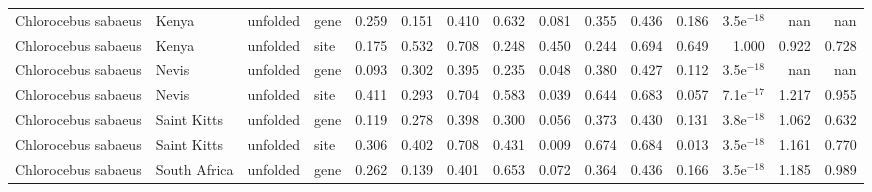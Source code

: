 \begin{longtable}{llllrrrrrrrrrrr}
 Chlorocebus sabaeus &                     Kenya &  unfolded &  gene &                              0.259 &                               0.151 &                 0.410 &                 0.632 &                              0.081 &                               0.355 &                 0.436 &                 0.186 & 3.5e$^{-18}$ &    nan &    nan \\
 Chlorocebus sabaeus &                     Kenya &  unfolded &  site &                              0.175 &                               0.532 &                 0.708 &                 0.248 &                              0.450 &                               0.244 &                 0.694 &                 0.649 &        1.000 &  0.922 &  0.728 \\
 Chlorocebus sabaeus &                     Nevis &  unfolded &  gene &                              0.093 &                               0.302 &                 0.395 &                 0.235 &                              0.048 &                               0.380 &                 0.427 &                 0.112 & 3.5e$^{-18}$ &    nan &    nan \\
 Chlorocebus sabaeus &                     Nevis &  unfolded &  site &                              0.411 &                               0.293 &                 0.704 &                 0.583 &                              0.039 &                               0.644 &                 0.683 &                 0.057 & 7.1e$^{-17}$ &  1.217 &  0.955 \\
 Chlorocebus sabaeus &               Saint Kitts &  unfolded &  gene &                              0.119 &                               0.278 &                 0.398 &                 0.300 &                              0.056 &                               0.373 &                 0.430 &                 0.131 & 3.8e$^{-18}$ &  1.062 &  0.632 \\
 Chlorocebus sabaeus &               Saint Kitts &  unfolded &  site &                              0.306 &                               0.402 &                 0.708 &                 0.431 &                              0.009 &                               0.674 &                 0.684 &                 0.013 & 3.5e$^{-18}$ &  1.161 &  0.770 \\
 Chlorocebus sabaeus &              South Africa &  unfolded &  gene &                              0.262 &                               0.139 &                 0.401 &                 0.653 &                              0.072 &                               0.364 &                 0.436 &                 0.166 & 3.5e$^{-18}$ &  1.185 &  0.989 \\

\end{longtable}
